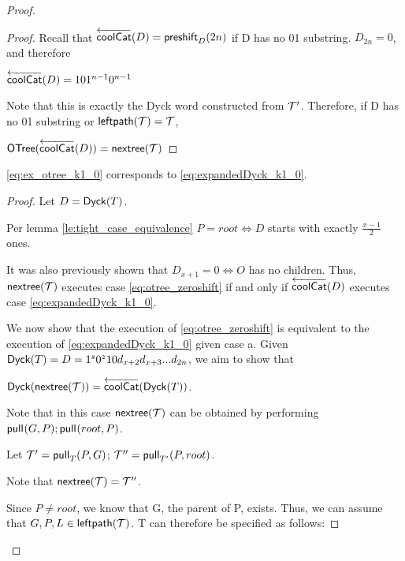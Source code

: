 \begin{proof}
\begin{proof}
    Recall that $\coolCat{D}=\preshift{D}{2n}$ if D has no 01 substring. $D_{2n}=0$, and therefore 

    $\coolCat{D}=101^{n-1}0^{n-1}$
     
     Note that this is exactly the Dyck word constructed from $\tree{T}'$.  Therefore, if D has no 01 substring or $\leftdown{\tree{T}}=\tree{T}$, 

     $\otree{\coolCat{D}}=\nextTree{T}$

\end{proof}
\begin{lemma}
    \eqref{eq:ex_otree_k1_0} corresponds to \eqref{eq:expandedDyck_k1_0}.
\end{lemma}
\begin{proof}
    Let $D=\dyck{T}$.

    Per lemma \ref{le:tight_case_equivalence} $P=root \iff D$ starts with exactly $\frac{x-1}{2}$ ones.  

    It was also previously shown that $D_{x+1}=0 \iff O$ has no children.  
    Thus, $\nextTree{T}$ executes case \eqref{eq:otree_zeroshift} if and only if $\coolCat{D}$ executes case   \eqref{eq:expandedDyck_k1_0}.

    \bigskip

    We now show that the execution of \eqref{eq:otree_zeroshift} is equivalent to the execution of \eqref{eq:expandedDyck_k1_0} given case a.
    Given $\dyck{T}=D=1^s0^{z}10d_{x+2}d_{x+3}...d_{2n}$, we aim to show that 

    $\dyck{\nextTree{T}}=\coolCat{\dyck{T}}$.
    \bigskip

    Note that in this case $\nextTree{T}$ can be obtained by performing $\poppush{G}{P};\poppush{root}{P}$. 

	    Let $\tree{T}'=\poppush[T]{P}{G}$; $\tree{T}''=\poppush[T']{P}{root}$.

	    Note that $\nextTree{T}=\tree{T}''$.

    Since $P \ne root$, we know that G, the parent of P, exists. 
    Thus, we can assume that $G,P,L \in \leftdown{\tree{T}}$.  T can therefore be specified as follows: 





\end{proof}
\end{proof}
